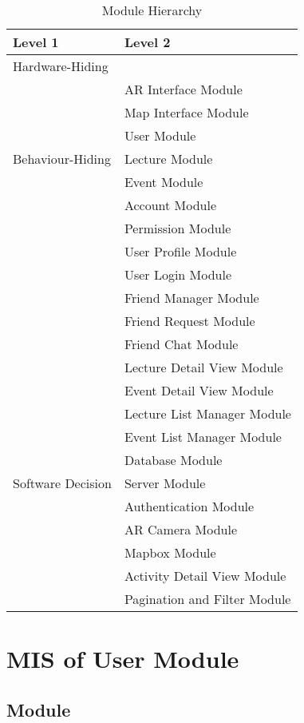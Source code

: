 \documentclass[12pt, titlepage]{article}
\begin{document}
\begin{table}[h!]
\centering
\begin{tabular}{p{} p{}}
\toprule
\textbf{Level 1} & \textbf{Level 2}\\
\midrule

{Hardware-Hiding} & ~ \\
\midrule

\multirow{7}{0.3\textwidth}{Behaviour-Hiding}
& AR Interface Module\\
& Map Interface Module\\
& User Module\\
& Lecture Module\\
& Event Module\\
& Account Module\\
& Permission Module\\
& User Profile Module\\
& User Login Module\\
& Friend Manager Module\\ 
& Friend Request Module\\
& Friend Chat Module\\
& Lecture Detail View Module\\
& Event Detail View Module\\
& Lecture List Manager Module\\
& Event List Manager Module\\
\midrule

\multirow{3}{0.3\textwidth}{Software Decision}
& Database Module\\
& Server Module\\
& Authentication Module\\
& AR Camera Module\\
& Mapbox Module\\
& Activity Detail View Module\\
& Pagination and Filter Module\\
\bottomrule

\end{tabular}
\caption{Module Hierarchy}
\label{TblMH}
\end{table}

\newpage

\section{MIS of User Module} \label{mUser}

\subsection{Module}
\end{document}
